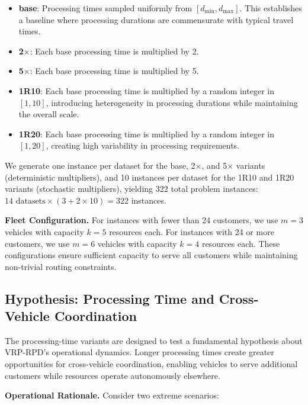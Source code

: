 \documentclass{article}
\begin{document}
\begin{itemize}
\item \textbf{base}: Processing times sampled uniformly from $[d_{\min}, d_{\max}]$. This establishes a baseline where processing durations are commensurate with typical travel times.

\item \textbf{2$\times$}: Each base processing time is multiplied by 2.

\item \textbf{5$\times$}: Each base processing time is multiplied by 5.

\item \textbf{1R10}: Each base processing time is multiplied by a random integer in $[1, 10]$, introducing heterogeneity in processing durations while maintaining the overall scale.

\item \textbf{1R20}: Each base processing time is multiplied by a random integer in $[1, 20]$, creating high variability in processing requirements.
\end{itemize}

We generate one instance per dataset for the base, 2$\times$, and 5$\times$ variants (deterministic multipliers), and 10 instances per dataset for the 1R10 and 1R20 variants (stochastic multipliers), yielding 322 total problem instances: $14 \text{ datasets} \times (3 + 2 \times 10) = 322$ instances.

\textbf{Fleet Configuration.} For instances with fewer than 24 customers, we use $m = 3$ vehicles with capacity $k = 5$ resources each. For instances with 24 or more customers, we use $m = 6$ vehicles with capacity $k = 4$ resources each. These configurations ensure sufficient capacity to serve all customers while maintaining non-trivial routing constraints.

\subsection{Hypothesis: Processing Time and Cross-Vehicle Coordination}

The processing-time variants are designed to test a fundamental hypothesis about VRP-RPD's operational dynamics. Longer processing times create greater opportunities for cross-vehicle coordination, enabling vehicles to serve additional customers while resources operate autonomously elsewhere.

\textbf{Operational Rationale.} Consider two extreme scenarios:
\end{document}
